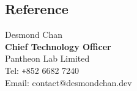 \documentclass[10pt]{article} %
\begin{document}
\begin{changemargin}{0pt}{0.5pt}
\begin{minipage}[t]{0.44\textwidth}
\section{Reference}

\begin{changemargin}{5pt}{5pt}
	

Desmond Chan\\
\textbf{Chief Technology Officer}\\
Pantheon Lab Limited\\
Tel: \texttt{+}852 6682 7240\\
Email: contact@desmondchan.dev\\


\end{changemargin}


	
	


\end{minipage} %

\end{changemargin}
\end{document}

